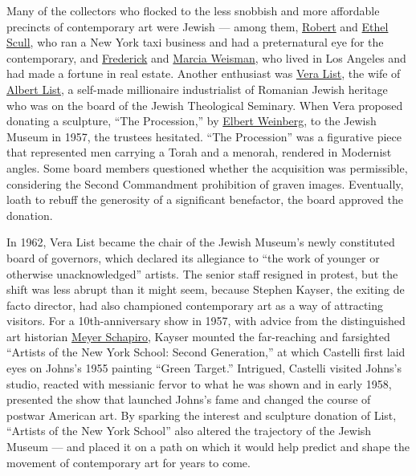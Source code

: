 Many of the collectors who flocked to the less snobbish and more
affordable precincts of contemporary art were Jewish --- among them,
\href{https://www.nytimes.com/1986/01/03/obituaries/robert-scull-prominent-collector-of-pop-art.html}{Robert}
and
\href{https://www.nytimes.com/2001/09/01/arts/ethel-scull-a-patron-of-pop-and-minimal-art-dies-at-79.html}{Ethel
Scull}, who ran a New York taxi business and had a preternatural eye for
the contemporary, and
\href{https://www.nytimes.com/1994/09/13/obituaries/frederick-weisman-82-leader-in-the-business-and-art-worlds.html}{Frederick}
and
\href{https://www.nytimes.com/1991/10/22/arts/marcia-weisman-collector-73-supporter-of-major-art-museums.html}{Marcia
Weisman}, who lived in Los Angeles and had made a fortune in real
estate. Another enthusiast was
\href{https://www.nytimes.com/2002/10/13/nyregion/vera-g-list-94-is-dead-philanthropist-and-collector.html}{Vera
List}, the wife of
\href{https://www.nytimes.com/1987/09/12/obituaries/albert-a-list-86-industrialist-who-supported-many-causes.html}{Albert
List}, a self-made millionaire industrialist of Romanian Jewish heritage
who was on the board of the Jewish Theological Seminary. When Vera
proposed donating a sculpture, ``The Procession,'' by
\href{http://www.elbertweinberg.com/index.html}{Elbert Weinberg}, to the
Jewish Museum in 1957, the trustees hesitated. ``The Procession'' was a
figurative piece that represented men carrying a Torah and a menorah,
rendered in Modernist angles. Some board members questioned whether the
acquisition was permissible, considering the Second Commandment
prohibition of graven images. Eventually, loath to rebuff the generosity
of a significant benefactor, the board approved the donation.

In 1962, Vera List became the chair of the Jewish Museum's newly
constituted board of governors, which declared its allegiance to ``the
work of younger or otherwise unacknowledged'' artists. The senior staff
resigned in protest, but the shift was less abrupt than it might seem,
because Stephen Kayser, the exiting de facto director, had also
championed contemporary art as a way of attracting visitors. For a
10th-anniversary show in 1957, with advice from the distinguished art
historian
\href{https://www.nytimes.com/1996/03/04/us/meyer-schapiro-91-is-dead-his-work-wove-art-and-life.html}{Meyer
Schapiro}, Kayser mounted the far-reaching and farsighted ``Artists of
the New York School: Second Generation,'' at which Castelli first laid
eyes on Johns's 1955 painting ``Green Target.'' Intrigued, Castelli
visited Johns's studio, reacted with messianic fervor to what he was
shown and in early 1958, presented the show that launched Johns's fame
and changed the course of postwar American art. By sparking the interest
and sculpture donation of List, ``Artists of the New York School'' also
altered the trajectory of the Jewish Museum --- and placed it on a path
on which it would help predict and shape the movement of contemporary
art for years to come.

